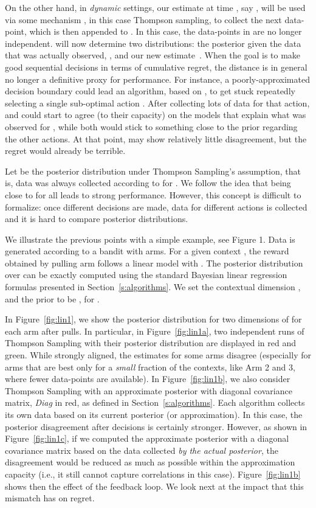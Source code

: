 \documentclass{article} \usepackage{iclr2018_conference,times}
\begin{document}
On the other hand, in \emph{dynamic} settings, our estimate at time , say , will be used via some mechanism , in this case Thompson sampling, to collect the next data-point, which is then appended to . In this case, the data-points in  are no longer independent.
 will now determine two distributions: the posterior given the data that was actually observed, , and our new estimate~.
When the goal is to make good sequential decisions in terms of cumulative regret, the distance  is in general no longer a definitive proxy for performance.
For instance, a poorly-approximated decision boundary could lead an algorithm, based on , to get stuck repeatedly selecting a single sub-optimal action .
After collecting lots of data for that action,  and  could start to agree (to their capacity) on the models that explain what was observed for , while both would stick to something close to the prior regarding the other actions.
At that point,  may show relatively little disagreement, but the regret would already be terrible.

Let  be the posterior distribution  under Thompson Sampling's assumption, that is, data was always collected according to  for .
We follow the idea that  being close to  for all  leads to strong performance.
However, this concept is difficult to formalize: once different decisions are made, data for different actions is collected and it is hard to compare posterior distributions.

We illustrate the previous points with a simple example, see Figure 1.
Data is generated according to a bandit with  arms.
For a given context , the reward obtained by pulling arm  follows a linear model  with .
The posterior distribution over  can be exactly computed using the standard Bayesian linear regression formulas presented in Section~\ref{s:algorithms}.
We set the contextual dimension , and the prior to be , for  .

In Figure~\ref{fig:lin1}, we show the posterior distribution for two dimensions of  for each arm  after  pulls.
In particular, in Figure~\ref{fig:lin1a}, two independent runs of Thompson Sampling with their posterior distribution are displayed in red and green.
While strongly aligned, the estimates for some arms disagree (especially for arms that are best only for a \emph{small} fraction of the contexts, like Arm 2 and 3, where fewer data-points are available).
In Figure~\ref{fig:lin1b}, we also consider Thompson Sampling with an approximate posterior with diagonal covariance matrix, \emph{Diag} in red, as defined in Section~\ref{s:algorithms}.
Each algorithm collects its own data based on its current posterior (or approximation).
In this case, the posterior disagreement after  decisions is certainly stronger.
However, as shown in Figure~\ref{fig:lin1c}, if we computed the approximate posterior with a diagonal covariance matrix based on the data collected \emph{by the actual posterior}, the disagreement would be reduced as much as possible within the approximation capacity (i.e., it still cannot capture correlations in this case).
Figure~\ref{fig:lin1b} shows then the effect of the feedback loop.
We look next at the impact that this mismatch has on regret.
\end{document}

